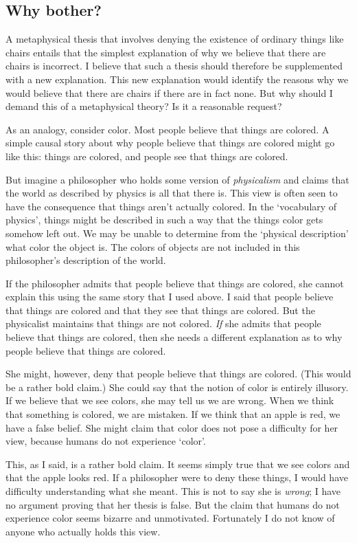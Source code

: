 \documentclass[11pt]{standalone}
\begin{document}
\begin{spacing}{1.5}
\subsection{Why bother?}
A metaphysical thesis that involves denying the existence of ordinary
things like chairs entails that the simplest explanation of why we
believe that there are chairs is incorrect.  I believe that such a
thesis should therefore be supplemented with a new explanation.  This
new explanation would identify the reasons why we would believe that
there are chairs if there are in fact none.  But why should I demand
this of a metaphysical theory?  Is it a reasonable request?

As an analogy, consider color.  Most people believe that things are
colored.  A simple causal story about why people believe that things
are colored might go like this:  things are colored, and people see
that things are colored.  

But imagine a philosopher who holds some version of {\em physicalism}
and claims that the world as described by physics is all that there
is.  This view is often seen to have the consequence that things
aren't actually colored.  In the `vocabulary of physics', things might
be described in such a way that the things color gets somehow left
out.  We may be unable to determine from the `physical description'
what color the object is.  The colors of objects are not included in
this philosopher's description of the world.

If the philosopher admits that people believe that things are colored,
she cannot explain this using the same story that I used above.  I
said that people believe that things are colored and that they see
that things are colored.  But the physicalist maintains that things
are not colored.  {\em If} she admits that people believe that things
are colored, then she needs a different explanation as to why people
believe that things are colored.

She might, however, deny that people believe that things are colored.
(This would be a rather bold claim.)  She could say that the notion of
color is entirely illusory.  If we believe that we see colors, she may
tell us we are wrong.  When we think that something is colored, we are
mistaken.  If we think that an apple is red, we have a false belief.
She might claim that color does not pose a difficulty for her view,
because humans do not experience `color'.

This, as I said, is a rather bold claim.  It seems simply true that we
see colors and that the apple looks red.  If a philosopher were to
deny these things, I would have difficulty understanding what she
meant.  This is not to say she is {\em wrong}; I have no argument
proving that her thesis is false.  But the claim that humans do not
experience color seems bizarre and unmotivated.  Fortunately I do not
know of anyone who actually holds this view.


\end{spacing}
\end{document}
